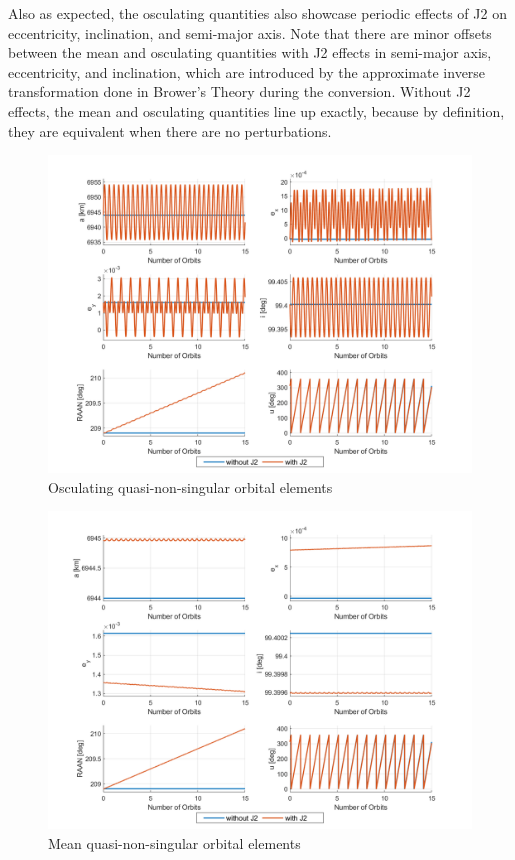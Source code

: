 Also as expected, the osculating quantities also showcase periodic effects of J2 on eccentricity, inclination, and semi-major axis. Note that there are minor offsets between the mean and osculating quantities with J2 effects in semi-major axis, eccentricity, and inclination, which are introduced by the approximate inverse transformation done in Brower's Theory during the conversion. Without J2 effects, the mean and osculating quantities line up exactly, because by definition, they are equivalent when there are no perturbations. 

\begin{figure}[H]
    \centering
    \includegraphics[width=0.75\linewidth]{sim/figures/PS4/OE_abs_osc_SV2.png}
    \caption{Osculating quasi-non-singular orbital elements}
    \label{fig:osc_OE}
\end{figure}

\begin{figure}[H]
    \centering
    \includegraphics[width=0.75\linewidth]{sim/figures/PS4/OE_abs_mean_SV2.png}
    \caption{Mean quasi-non-singular orbital elements}
    \label{fig:mean_OE}
\end{figure}

